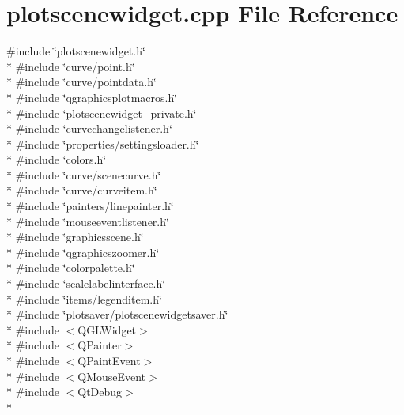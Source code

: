 \section{plotscenewidget.\+cpp File Reference}
\label{bk3_2plotscenewidget_8cpp}
{\ttfamily \#include \char`\"{}plotscenewidget.\+h\char`\"{}}\\*
{\ttfamily \#include \char`\"{}curve/point.\+h\char`\"{}}\\*
{\ttfamily \#include \char`\"{}curve/pointdata.\+h\char`\"{}}\\*
{\ttfamily \#include \char`\"{}qgraphicsplotmacros.\+h\char`\"{}}\\*
{\ttfamily \#include \char`\"{}plotscenewidget\+\_\+private.\+h\char`\"{}}\\*
{\ttfamily \#include \char`\"{}curvechangelistener.\+h\char`\"{}}\\*
{\ttfamily \#include \char`\"{}properties/settingsloader.\+h\char`\"{}}\\*
{\ttfamily \#include \char`\"{}colors.\+h\char`\"{}}\\*
{\ttfamily \#include \char`\"{}curve/scenecurve.\+h\char`\"{}}\\*
{\ttfamily \#include \char`\"{}curve/curveitem.\+h\char`\"{}}\\*
{\ttfamily \#include \char`\"{}painters/linepainter.\+h\char`\"{}}\\*
{\ttfamily \#include \char`\"{}mouseeventlistener.\+h\char`\"{}}\\*
{\ttfamily \#include \char`\"{}graphicsscene.\+h\char`\"{}}\\*
{\ttfamily \#include \char`\"{}qgraphicszoomer.\+h\char`\"{}}\\*
{\ttfamily \#include \char`\"{}colorpalette.\+h\char`\"{}}\\*
{\ttfamily \#include \char`\"{}scalelabelinterface.\+h\char`\"{}}\\*
{\ttfamily \#include \char`\"{}items/legenditem.\+h\char`\"{}}\\*
{\ttfamily \#include \char`\"{}plotsaver/plotscenewidgetsaver.\+h\char`\"{}}\\*
{\ttfamily \#include $<$Q\+G\+L\+Widget$>$}\\*
{\ttfamily \#include $<$Q\+Painter$>$}\\*
{\ttfamily \#include $<$Q\+Paint\+Event$>$}\\*
{\ttfamily \#include $<$Q\+Mouse\+Event$>$}\\*
{\ttfamily \#include $<$Qt\+Debug$>$}\\*
